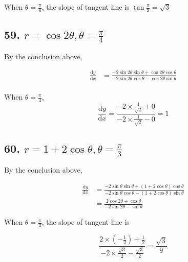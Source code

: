 \documentclass{article}
\begin{document}
    When $\theta = \frac \pi 6$, the slope of tangent line is $\tan \frac \pi 3 = \sqrt 3$

    \subsection*{59. $r = \cos 2\theta, \theta = \frac \pi 4$}
    
    By the conclusion above, 

    $$\begin{aligned}
        \frac{\mathrm dy}{\mathrm dx} &= \frac{-2\sin 2\theta \sin \theta + \cos 2\theta \cos \theta}{-2\sin 2\theta \cos \theta - \cos 2\theta \sin \theta} \\
    \end{aligned}$$

    When $\theta = \frac \pi 4$, $$\frac{\mathrm dy}{\mathrm dx} = \frac{-2 \times \frac{1}{\sqrt 2} + 0}{-2 \times \frac{1}{\sqrt 2} - 0} = 1$$

    \subsection*{60. $r = 1 + 2\cos \theta, \theta = \frac \pi 3$}

    By the conclusion above,

    $$\begin{aligned}
        \frac{\mathrm dy}{\mathrm dx} &= \frac{-2\sin \theta \sin \theta + (1 + 2\cos \theta) \cos \theta}{-2\sin \theta \cos \theta - (1 + 2\cos \theta) \sin \theta} \\
        &= \frac{2\cos 2\theta + \cos \theta}{-2\sin 2\theta -\sin \theta}
    \end{aligned}$$

    When $\theta = \frac \pi 3$, the slope of tangent line is

    $$\frac{2 \times (-\frac 1 2) + \frac 1 2}{-2 \times \frac{\sqrt 3}{2} - \frac{\sqrt 3}{2}} = \frac{\sqrt 3}{9}$$
\end{document}
